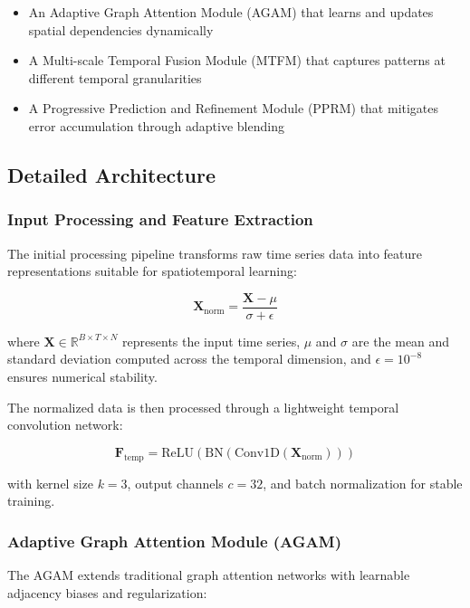 \documentclass[lettersize, journal]{IEEEtran}
\begin{document}
\begin{itemize}
    \item An Adaptive Graph Attention Module (AGAM) that learns and updates spatial dependencies dynamically
    \item A Multi-scale Temporal Fusion Module (MTFM) that captures patterns at different temporal granularities
    \item A Progressive Prediction and Refinement Module (PPRM) that mitigates error accumulation through adaptive blending
\end{itemize}

\subsection{Detailed Architecture}

\subsubsection{Input Processing and Feature Extraction}
The initial processing pipeline transforms raw time series data into feature representations suitable for spatiotemporal learning:

\begin{equation}
\mathbf{X}_{\text{norm}} = \frac{\mathbf{X} - \mu}{\sigma + \epsilon}
\end{equation}

where $\mathbf{X} \in \mathbb{R}^{B \times T \times N}$ represents the input time series, $\mu$ and $\sigma$ are the mean and standard deviation computed across the temporal dimension, and $\epsilon = 10^{-8}$ ensures numerical stability.

The normalized data is then processed through a lightweight temporal convolution network:

\begin{equation}
\mathbf{F}_{\text{temp}} = \text{ReLU}(\text{BN}(\text{Conv1D}(\mathbf{X}_{\text{norm}})))
\end{equation}

with kernel size $k=3$, output channels $c=32$, and batch normalization for stable training.

\subsubsection{Adaptive Graph Attention Module (AGAM)}
The AGAM extends traditional graph attention networks with learnable adjacency biases and regularization:
\end{document}
